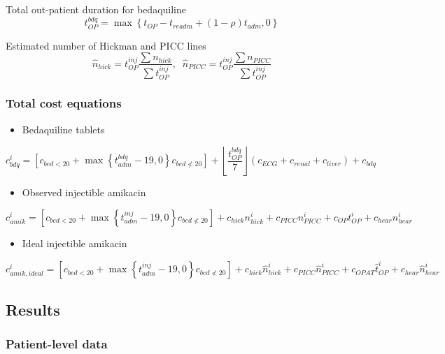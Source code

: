 \documentclass[]{article}
\providecommand{\tightlist}{%
  \setlength{\itemsep}{0pt}\setlength{\parskip}{0pt}}
\begin{document}
Total out-patient duration for bedaquiline \[
t_{OP}^{bdq}=\max{\left\{t_{OP}-t_{readm}+(1-\rho)t_{adm},0\right\}}
\]

Estimated number of Hickman and PICC lines \[
\hat{n}_{hick} = t_{OP}^{inj} \frac{\sum n_{hick}}{\sum t_{OP}^{inj}}, \;\; \hat{n}_{PICC} = t_{OP}^{inj} \frac{\sum n_{PICC}}{\sum t_{OP}^{inj}} 
\]

\hypertarget{total-cost-equations}{%
\subsubsection{Total cost equations}\label{total-cost-equations}}

\begin{itemize}
\tightlist
\item
  Bedaquiline tablets
\end{itemize}

\[
c_{bdq}^i=\left[c_{bed<20}+\max{\left\{t_{adm}^{bdq}-19,0\right\}}c_{bed\nless20}\right]+\left\lfloor\frac{t_{OP}^{bdq}}{7}\right\rfloor\left(c_{ECG}+c_{renal}+c_{liver}\right)+c_{bdq}
\]

\begin{itemize}
\tightlist
\item
  Observed injectible amikacin
\end{itemize}

\[
c_{amik}^i=\left[c_{bed<20}+\max{\left\{t_{adm}^{inj}-19,0\right\}}c_{bed\nless20}\right]+c_{hick}n_{hick}^i+c_{PICC}n_{PICC}^i+c_{OP}t_{OP}^i+c_{hear}n_{hear}^i
\]

\begin{itemize}
\tightlist
\item
  Ideal injectible amikacin
\end{itemize}

\[
c_{amik,ideal}^i=\left[c_{bed<20}+\max{\left\{t_{adm}^{inj}-19,0\right\}}c_{bed\nless20}\right]+c_{hick}\hat{n}_{hick}^i+c_{PICC}\hat{n}_{PICC}^i+c_{OPAT}\hat{t}^{i}_{OP}+c_{hear}\hat{n}_{hear}^i
\]

\hypertarget{results}{%
\subsection{Results}\label{results}}

\hypertarget{patient-level-data}{%
\subsubsection{Patient-level data}\label{patient-level-data}}
\end{document}
